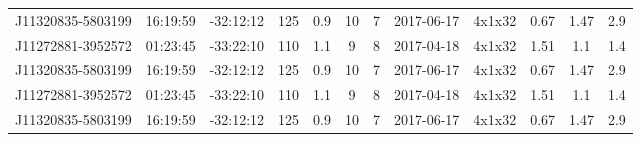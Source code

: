 \documentclass[onecolumn]{aa} %
\begin{document}
{\begin{landscape}
\begin{longtable}{cccccccccccc}
J11320835-5803199 & 16:19:59 & -32:12:12 & 125 & 0.9 & 10 & 7 & 2017-06-17 & 4x1x32 & 0.67 & 1.47 & 2.9 \\
J11272881-3952572 & 01:23:45 & -33:22:10 & 110 & 1.1 & 9 & 8 & 2017-04-18 & 4x1x32 & 1.51 & 1.1 & 1.4 \\
J11320835-5803199 & 16:19:59 & -32:12:12 & 125 & 0.9 & 10 & 7 & 2017-06-17 & 4x1x32 & 0.67 & 1.47 & 2.9 \\
J11272881-3952572 & 01:23:45 & -33:22:10 & 110 & 1.1 & 9 & 8 & 2017-04-18 & 4x1x32 & 1.51 & 1.1 & 1.4 \\
J11320835-5803199 & 16:19:59 & -32:12:12 & 125 & 0.9 & 10 & 7 & 2017-06-17 & 4x1x32 & 0.67 & 1.47 & 2.9 \\

\end{longtable}
\end{landscape}
}
\end{document}
